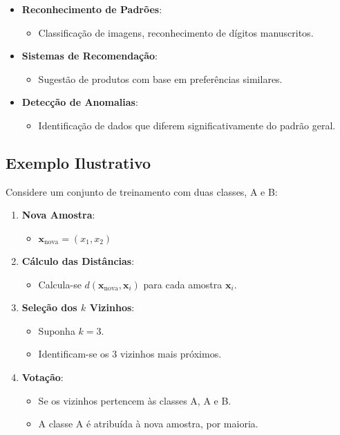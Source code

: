 \documentclass{sciposter}
\begin{document}
\begin{multicols}{3}
\begin{itemize}
    \item \textbf{Reconhecimento de Padrões}:
    \begin{itemize}
        \item Classificação de imagens, reconhecimento de dígitos manuscritos.
    \end{itemize}
    \item \textbf{Sistemas de Recomendação}:
    \begin{itemize}
        \item Sugestão de produtos com base em preferências similares.
    \end{itemize}
    \item \textbf{Detecção de Anomalias}:
    \begin{itemize}
        \item Identificação de dados que diferem significativamente do padrão geral.
    \end{itemize}
\end{itemize}

\subsection{Exemplo Ilustrativo}

Considere um conjunto de treinamento com duas classes, A e B:

\begin{enumerate}
    \item \textbf{Nova Amostra}:
    \begin{itemize}
        \item $\mathbf{x}_{\text{nova}} = (x_1, x_2)$
    \end{itemize}
    \item \textbf{Cálculo das Distâncias}:
    \begin{itemize}
        \item Calcula-se $d(\mathbf{x}_{\text{nova}}, \mathbf{x}_i)$ para cada amostra $\mathbf{x}_i$.
    \end{itemize}
    \item \textbf{Seleção dos $k$ Vizinhos}:
    \begin{itemize}
        \item Suponha $k = 3$.
        \item Identificam-se os 3 vizinhos mais próximos.
    \end{itemize}
    \item \textbf{Votação}:
    \begin{itemize}
        \item Se os vizinhos pertencem às classes A, A e B.
        \item A classe A é atribuída à nova amostra, por maioria.
    \end{itemize}
\end{enumerate}


\end{multicols}
\end{document}
